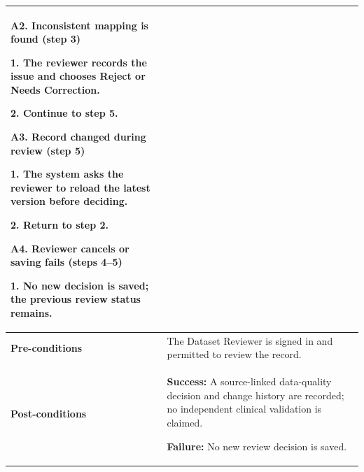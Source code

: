 \begin{longtable}{|p{}|p{}|}
\par\smallskip
\textbf{A2. Inconsistent mapping is found (step 3)}\par
1. The reviewer records the issue and chooses Reject or Needs Correction.\par
2. Continue to step 5.
\par\smallskip
\textbf{A3. Record changed during review (step 5)}\par
1. The system asks the reviewer to reload the latest version before deciding.\par
2. Return to step 2.
\par\smallskip
\textbf{A4. Reviewer cancels or saving fails (steps 4--5)}\par
1. No new decision is saved; the previous review status remains.
\\ \hline
\textbf{Pre-conditions} & The Dataset Reviewer is signed in and permitted to review the record. \\ \hline
\textbf{Post-conditions} & \textbf{Success:} A source-linked data-quality decision and change history are recorded; no independent clinical validation is claimed.\par
\textbf{Failure:} No new review decision is saved. \\ \hline
\end{longtable}


